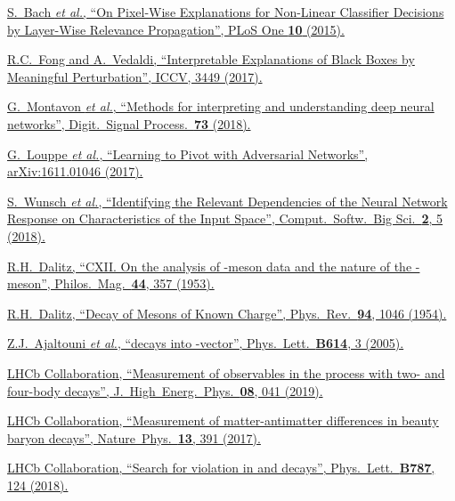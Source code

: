 \href{https://doi.org/10.1371/journal.pone.0130140}{S.~Bach \textit{et al.}, \enquote{On Pixel-Wise Explanations for Non-Linear Classifier Decisions by Layer-Wise Relevance Propagation}, PLoS One \textbf{10} (2015).}

\href{https://doi.org/10.1109/ICCV.2017.371}{R.C.~Fong and A.~Vedaldi, \enquote{Interpretable Explanations of Black Boxes by Meaningful Perturbation}, ICCV, 3449 (2017).}

\href{https://doi.org/10.1016/j.dsp.2017.10.011}{G.~Montavon \textit{et al.}, \enquote{Methods for interpreting and understanding deep neural networks}, Digit.\ Signal Process.\ \textbf{73} (2018).}

\href{https://arxiv.org/abs/1611.01046}{G.~Louppe \textit{et al.}, \enquote{Learning to Pivot with Adversarial Networks}, arXiv:1611.01046 (2017).}

\href{https://doi.org/10.1007/s41781-018-0012-1}{S.~Wunsch \textit{et al.}, \enquote{Identifying the Relevant Dependencies of the Neural Network Response on Characteristics of the Input Space}, Comput.\ Softw.\ Big Sci.\ \textbf{2}, 5 (2018).}

\href{https://doi.org/10.1080/14786441008520365}{R.H.~Dalitz, \enquote{CXII. On the analysis of \Ptau-meson data and the nature of the \Ptau-meson}, Philos.\ Mag.\ \textbf{44}, 357 (1953).}

\href{https://doi.org/10.1103/PhysRev.94.1046}{R.H.~Dalitz, \enquote{Decay of \Ptau Mesons of Known Charge}, Phys.\ Rev.\ \textbf{94}, 1046 (1954).}

\href{https://doi.org/10.1016/j.physletb.2005.04.014}{Z.J.~Ajaltouni \textit{et al.}, \enquote{\Lb decays into \Lz-vector}, Phys.\ Lett.\ \textbf{B614}, 3 (2005).}

\href{https://doi.org/10.1007/JHEP08(2019)041}{LHCb Collaboration, \enquote{Measurement of \CP observables in the process \decay{\Bd}{\PD\Kstarz} with two- and four-body \PD decays}, J.\ High\ Energ.\ Phys.\ \textbf{08}, 041 (2019).}

\href{https://doi.org/10.1038/nphys4021}{LHCb Collaboration, \enquote{Measurement of matter-antimatter differences in beauty baryon decays}, Nature\, Phys.\ \textbf{13}, 391 (2017).}

\href{https://doi.org/10.1016/j.physletb.2018.10.039}{LHCb Collaboration, \enquote{Search for \CP violation in  and  decays}, Phys.\ Lett.\ \textbf{B787}, 124 (2018).}

